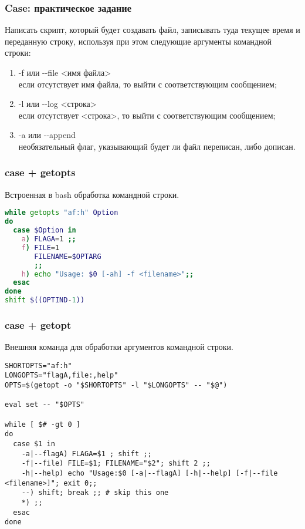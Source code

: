 \begin{frame}
	\frametitle{Case: практическое задание}

	Написать скрипт, который будет создавать файл, 
	записывать туда текущее время и переданную строку,
	используя при этом следующие аргументы командной строки: 

	\begin{enumerate}
		\item -f или -{}-file <имя файла>\\
			если отсутствует имя файла, то выйти с соответствующим сообщением;
		\item -l или -{}-log <строка>\\
			если отсутствует <строка>, то выйти с соответствующим сообщением;
		\item -a или -{}-append \\
			необязательный флаг, указывающий будет ли файл переписан, либо дописан.
	\end{enumerate}

\end{frame}

\begin{frame}[fragile]
	\frametitle{case + getopts}
	
	Встроенная в bash обработка командной строки.

\begin{lstlisting}[language=sh,frame=single]
while getopts "af:h" Option
do
  case $Option in 
    a) FLAGA=1 ;;
    f) FILE=1
       FILENAME=$OPTARG
       ;;
    h) echo "Usage: $0 [-ah] -f <filename>";;
  esac  
done
shift $((OPTIND-1))
\end{lstlisting}
\end{frame}

\begin{frame}[fragile]
\frametitle{case + getopt}
	
	Внешняя команда для обработки аргументов командной строки.

	\small
	\begin{lstlisting}
SHORTOPTS="af:h"
LONGOPTS="flagA,file:,help"
OPTS=$(getopt -o "$SHORTOPTS" -l "$LONGOPTS" -- "$@")

eval set -- "$OPTS"

while [ $# -gt 0 ]
do
  case $1 in
    -a|--flagA) FLAGA=$1 ; shift ;;
    -f|--file) FILE=$1; FILENAME="$2"; shift 2 ;;
    -h|--help) echo "Usage:$0 [-a|--flagA] [-h|--help] [-f|--file <filename>]"; exit 0;;
    --) shift; break ;; # skip this one
    *) ;;
  esac
done
	\end{lstlisting}

\end{frame}


